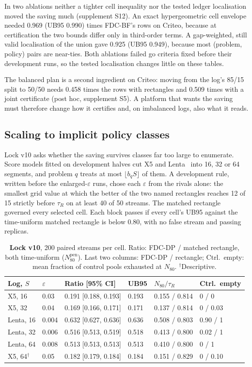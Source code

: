\documentclass[sigconf,anonymous,review]{acmart}
\newcommand{\eps}{\varepsilon}
\newcommand{\Npen}{N_{80}^{\text{pen}}}
\begin{document}
In two ablations neither a tighter cell inequality nor the tested ledger localisation moved the saving much (supplement S12). An exact hypergeometric cell envelope needed 0.969 (UB95 0.990) times FDC-BF's rows on Criteo, because at certification the two bounds differ only in third-order terms. A gap-weighted, still valid localisation of the union gave 0.925 (UB95 0.949), because most (problem, policy) pairs are near-ties. Both ablations failed go criteria fixed before their development runs, so the tested localisation changes little on these tables.

The balanced plan is a second ingredient on Criteo: moving from the log's 85/15 split to 50/50 needs 0.458 times the rows with rectangles and 0.509 times with a joint certificate (post hoc, supplement S5). A platform that wants the saving must therefore change how it certifies and, on imbalanced logs, also what it reads.

\subsection{Scaling to implicit policy classes}\label{sec:scale}

Lock v10 asks whether the saving survives classes far too large to enumerate. Score models fitted on development halves cut X5 and Lenta~\citep{scikituplift2020} into 16, 32 or 64 segments, and problem $q$ treats at most $\lfloor b_q S \rfloor$ of them. A development rule, written before the enlarged-$\eps$ runs, chose each $\eps$ from the rivals alone: the smallest grid value at which the better of the two named rectangles reaches 12 of 15 strictly before $\tau_R$ on at least 40 of 50 streams. The matched rectangle governed every selected cell. Each block passes if every cell's UB95 against the time-uniform matched rectangle is below 0.80, with no false stream and passing replicas.

\begin{table}[t]
\caption{\textbf{Lock v10}, 200 paired streams per cell. Ratio: FDC-DP / matched rectangle, both time-uniform ($\Npen$). Last two columns: FDC-DP / rectangle; Ctrl.\ empty: mean fraction of control pools exhausted at $N_{80}$. $^\dagger$Descriptive.}
\label{tab:scale}
\small
\setlength{\tabcolsep}{2.6pt}
\begin{tabular}{@{}llllll@{}}
\toprule
Log, $S$ & $\eps$ & Ratio [95\% CI] & UB95 & $N_{80}/\tau_R$ & Ctrl.\ empty \\
\midrule
X5, 16 & 0.03 & 0.191 [0.188, 0.193] & 0.193 & 0.155 / 0.814 & 0 / 0 \\
X5, 32 & 0.04 & 0.169 [0.166, 0.171] & 0.171 & 0.137 / 0.814 & 0 / 0.03 \\
Lenta, 16 & 0.004 & 0.632 [0.627, 0.636] & 0.636 & 0.508 / 0.803 & 0.90 / 1 \\
Lenta, 32 & 0.006 & 0.516 [0.513, 0.519] & 0.518 & 0.413 / 0.800 & 0.02 / 1 \\
Lenta, 64 & 0.008 & 0.513 [0.513, 0.513] & 0.513 & 0.410 / 0.800 & 0 / 1 \\
X5, 64$^\dagger$ & 0.05 & 0.182 [0.179, 0.184] & 0.184 & 0.151 / 0.829 & 0 / 0.10 \\
\bottomrule
\end{tabular}
\end{table}
\end{document}
